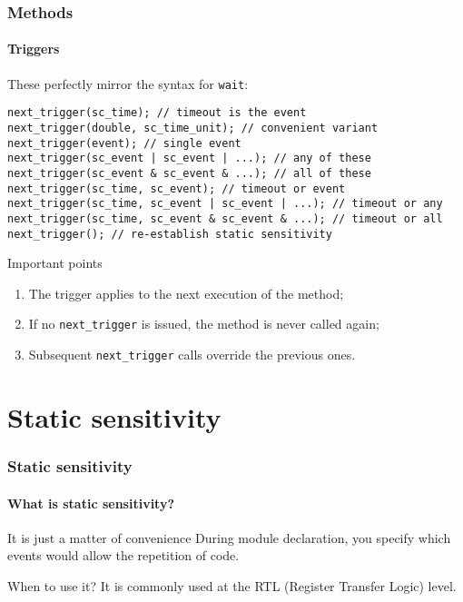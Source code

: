 \begin{frame}[fragile]
\frametitle{Methods}
\framesubtitle{Triggers}

\begin{block}{These perfectly mirror the syntax for \texttt{wait}:}
\vspace{-1em}
{\scriptsize 
\begin{verbatim}
next_trigger(sc_time); // timeout is the event
next_trigger(double, sc_time_unit); // convenient variant
next_trigger(event); // single event
next_trigger(sc_event | sc_event | ...); // any of these
next_trigger(sc_event & sc_event & ...); // all of these
next_trigger(sc_time, sc_event); // timeout or event
next_trigger(sc_time, sc_event | sc_event | ...); // timeout or any 
next_trigger(sc_time, sc_event & sc_event & ...); // timeout or all
next_trigger(); // re-establish static sensitivity
\end{verbatim}
}
\vspace{-1em}
\end{block}
\pause
\begin{block}{Important points}
\vspace{-0.5em}
\begin{enumerate}
\item The trigger applies to the next execution of the method;
\item If no \texttt{next\_trigger} is issued, the method is never called again;
\item Subsequent \texttt{next\_trigger} calls override the previous ones.
\end{enumerate}
\vspace{-0.5em}
\end{block}
\end{frame}

\section{Static sensitivity}

\begin{frame}
\frametitle{Static sensitivity}
\framesubtitle{What is static sensitivity?}

\begin{block}{It is just a matter of convenience}
During module declaration, you specify which events would allow the repetition of code.
\end{block}
\pause
\begin{block}{When to use it?}
It is commonly used at the RTL (Register Transfer Logic) level.
\end{block}

\end{frame}

